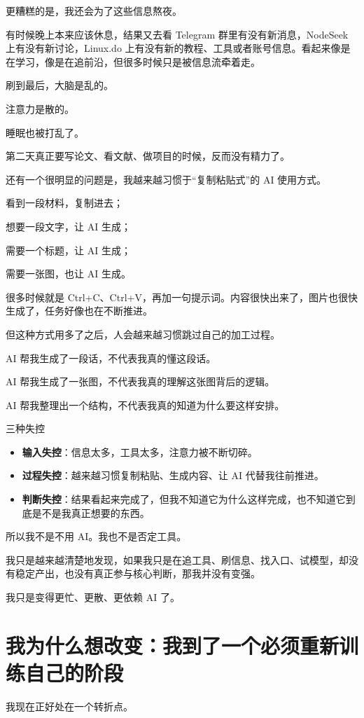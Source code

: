 \documentclass[UTF8,zihao=-4,a4paper]{ctexart}
\newcommand{\keyword}[1]{\textcolor{PrimaryDark}{\bfseries #1}}
\begin{document}
更糟糕的是，我还会为了这些信息熬夜。

有时候晚上本来应该休息，结果又去看 Telegram 群里有没有新消息，NodeSeek 上有没有新讨论，Linux.do 上有没有新的教程、工具或者账号信息。看起来像是在学习，像是在追前沿，但很多时候只是被信息流牵着走。

刷到最后，大脑是乱的。\par
注意力是散的。\par
睡眠也被打乱了。\par
第二天真正要写论文、看文献、做项目的时候，反而没有精力了。

还有一个很明显的问题是，我越来越习惯于“复制粘贴式”的 AI 使用方式。

看到一段材料，复制进去；\par
想要一段文字，让 AI 生成；\par
需要一个标题，让 AI 生成；\par
需要一张图，也让 AI 生成。

很多时候就是 Ctrl+C、Ctrl+V，再加一句提示词。内容很快出来了，图片也很快生成了，任务好像也在不断推进。

但这种方式用多了之后，人会越来越习惯跳过自己的加工过程。

AI 帮我生成了一段话，不代表我真的懂这段话。\par
AI 帮我生成了一张图，不代表我真的理解这张图背后的逻辑。\par
AI 帮我整理出一个结构，不代表我真的知道为什么要这样安排。

\begin{notebox}{三种失控}
\begin{itemize}
  \item \keyword{输入失控}：信息太多，工具太多，注意力被不断切碎。
  \item \keyword{过程失控}：越来越习惯复制粘贴、生成内容、让 AI 代替我往前推进。
  \item \keyword{判断失控}：结果看起来完成了，但我不知道它为什么这样完成，也不知道它到底是不是我真正想要的东西。
\end{itemize}
\end{notebox}

所以我不是不用 AI。我也不是否定工具。

我只是越来越清楚地发现，如果我只是在追工具、刷信息、找入口、试模型，却没有稳定产出，也没有真正参与核心判断，那我并没有变强。

我只是变得更忙、更散、更依赖 AI 了。

\section{我为什么想改变：我到了一个必须重新训练自己的阶段}
我现在正好处在一个转折点。
\end{document}
